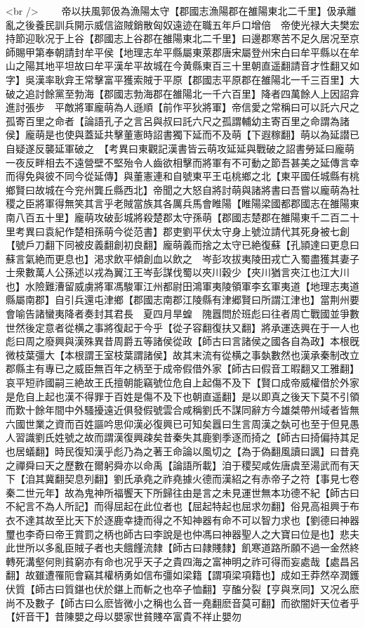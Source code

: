 <br />
　　帝以扶風郭伋為漁陽太守【郡國志漁陽郡在雒陽東北二千里】伋承離亂之後養民訓兵開示威信盜賊銷散匈奴遠迹在職五年戶口增倍　帝使光禄大夫樊宏持節迎耿况于上谷【郡國志上谷郡在雒陽東北二千里】曰邊郡寒苦不足久居况至京師賜甲第奉朝請封牟平侯【地理志牟平縣屬東萊郡唐宋屬登州宋白曰牟平縣以在牟山之陽其地平坦故曰牟平漢牟平故城在今黄縣東百三十里朝直遥翻請音才性翻又如字】吳漢率耿弇王常擊富平獲索賊于平原【郡國志平原郡在雒陽北一千三百里】大破之追討餘黨至勃海【郡國志勃海郡在雒陽北一千六百里】降者四萬餘人上因詔弇進討張步　平敵將軍龐萌為人遜順【前作平狄將軍】帝信愛之常稱曰可以託六尺之孤寄百里之命者【論語孔子之言呂與叔曰託六尺之孤謂輔幼主寄百里之命謂為諸侯】龐萌是也使與蓋延共擊董憲時詔書獨下延而不及萌【下遐稼翻】萌以為延譛已自疑遂反襲延軍破之　【考異曰東觀記漢書皆云萌攻延延與戰破之詔書勞延曰龐萌一夜反畔相去不遠營壁不堅殆令人齒欲相擊而將軍有不可動之節吾甚美之延傳言幸而得免與彼不同今從延傳】與董憲連和自號東平王屯桃鄉之北【東平國任城縣有桃鄉賢曰故城在今兖州龔丘縣西北】帝聞之大怒自將討萌與諸將書曰吾嘗以龐萌為社稷之臣將軍得無笑其言乎老賊當族其各厲兵馬會睢陽【睢陽梁國都郡國志在雒陽東南八百五十里】龐萌攻破彭城將殺楚郡太守孫萌【郡國志楚郡在雒陽東千二百二十里考異曰袁紀作楚相孫萌今從范書】郡吏劉平伏太守身上號泣請代其死身被七創【號戶刀翻下同被皮義翻創初良翻】龐萌義而捨之太守已絶復蘇【孔頴達曰更息曰蘇言氣絶而更息也】渇求飲平傾創血以飲之　岑彭攻拔夷陵田戎亡入蜀盡獲其妻子士衆數萬人公孫述以戎為翼江王岑彭謀伐蜀以夾川穀少【夾川猶言夾江也江大川也】水險難漕留威虜將軍馮駿軍江州都尉田鴻軍夷陵領軍李玄軍夷道【地理志夷道縣屬南郡】自引兵還屯津鄉【郡國志南郡江陵縣有津郷賢曰所謂江津也】當荆州要會喻告諸蠻夷降者奏封其君長　夏四月旱蝗　隗囂問於班彪曰往者周亡戰國並爭數世然後定意者從横之事將復起于今乎【從子容翻復扶又翻】將承運迭興在于一人也彪曰周之廢興與漢殊異昔周爵五等諸侯從政【師古曰言諸侯之國各自為政】本根旣微枝葉彊大【本根謂王室枝葉謂諸侯】故其末流有從横之事埶數然也漢承秦制改立郡縣主有專已之威臣無百年之柄至于成帝假借外家【師古曰假音工暇翻又工雅翻】哀平短祚國嗣三絶故王氏擅朝能竊號位危自上起傷不及下【賢口成帝威權借於外家是危自上起也漢不得罪于百姓是傷不及下也朝直遥翻】是以即真之後天下莫不引領而歎十餘年間中外騷擾遠近俱發假號雲合咸稱劉氏不謀同辭方今雄桀帶州域者皆無六國世業之資而百姓謳吟思仰漢必復興已可知矣囂曰生言周漢之埶可也至于但見愚人習識劉氏姓號之故而謂漢復興疎矣昔秦失其鹿劉季逐而掎之【師古曰掎偏持其足也居蟻翻】時民復知漢乎彪乃為之著王命論以風切之【為于偽翻風讀曰諷】曰昔堯之禪舜曰天之歷數在爾躬舜亦以命禹【論語所載】洎于稷契咸佐唐虞至湯武而有天下【洎其冀翻契息列翻】劉氏承堯之祚堯據火德而漢紹之有赤帝子之符【事見七卷秦二世元年】故為鬼神所福饗天下所歸往由是言之未見運世無本功德不紀【師古曰不紀言不為人所記】而得屈起在此位者也【屈起特起也屈求勿翻】俗見高祖興于布衣不達其故至比天下於逐鹿幸捷而得之不知神器有命不可以智力求也【劉德曰神器璽也李奇曰帝王賞罰之柄也師古曰李說是也仲馮曰神器聖人之大寶曰位是也】悲夫此世所以多亂臣賊子者也夫餓饉流隸【師古曰隷賤隸】飢寒道路所願不過一金然終轉死溝壑何則貧窮亦有命也况乎天子之貴四海之富神明之祚可得而妄處哉【處昌呂翻】故雖遭罹阨會竊其權柄勇如信布彊如梁籍【謂項梁項籍也】成如王莽然卒潤鑊伏質【師古曰質鍖也伏於鍖上而斬之也卒子恤翻】亨醢分裂【亨與烹同】又况么麽尚不及數子【師古曰么麽皆微小之稱也么音一堯翻麽音莫可翻】而欲闇奸天位者乎【奸音干】昔陳嬰之母以嬰家世貧賤卒富貴不祥止嬰勿